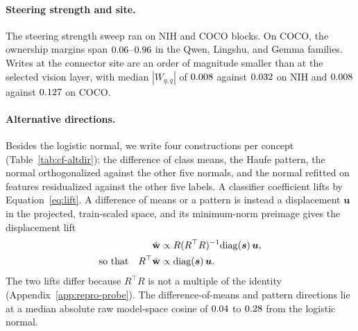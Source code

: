 \documentclass[11pt]{article}
\begin{document}
\paragraph{Steering strength and site.} The steering strength sweep ran on \cfDoseBlocksNih{} NIH and \cfDoseBlocksCoco{} COCO blocks. On COCO, the ownership margins span $0.06$--$0.96$ in the Qwen, Lingshu, and Gemma families. Writes at the connector site are an order of magnitude smaller than at the selected vision layer, with median $|W_{q,q}|$ of $0.008$ against $0.032$ on NIH and $0.008$ against $0.127$ on COCO.

\paragraph{Alternative directions.} Besides the logistic normal, we write four constructions per concept (Table~\ref{tab:cf-altdir}): the difference of class means, the Haufe pattern, the normal orthogonalized against the other five normals, and the normal refitted on features residualized against the other five labels. A classifier coefficient lifts by Equation~\ref{eq:lift}. A difference of means or a pattern is instead a displacement $\boldsymbol u$ in the projected, train-scaled space, and its minimum-norm preimage gives the displacement lift
\begin{equation}
\begin{aligned}
\hat{\mathbf{w}}&\propto R(R^{\top}R)^{-1}\mathrm{diag}(\boldsymbol s)\,\boldsymbol u,\\
\text{so that}\quad R^{\top}\hat{\mathbf{w}}&\propto\mathrm{diag}(\boldsymbol s)\,\boldsymbol u .
\end{aligned}
\label{eq:displacement-lift}
\end{equation}
The two lifts differ because $R^{\top}R$ is not a multiple of the identity (Appendix~\ref{app:repro-probe}). The difference-of-means and pattern directions lie at a median absolute raw model-space cosine of $0.04$ to $0.28$ from the logistic normal.
\end{document}
